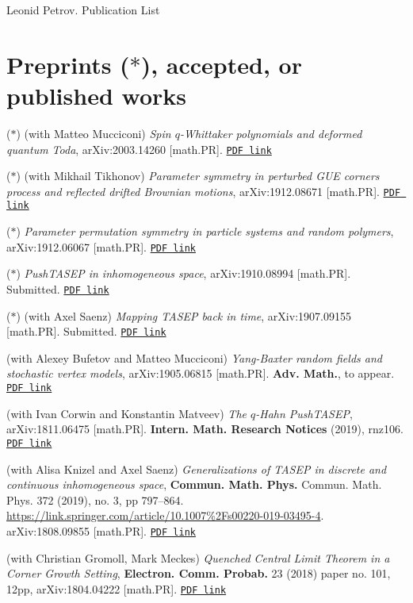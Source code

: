 \documentclass[letterpaper,11pt]{article}
\begin{document}
{\huge Leonid Petrov. Publication List}


\bigskip
\bigskip

\section*{Preprints ($*$), accepted, or published works}

\begin{etaremune}
	\renewcommand{\labelenumi}{[\theenumi]}
	\item ($*$)
		(with Matteo Mucciconi)
		\emph{Spin $q$-Whittaker polynomials and deformed quantum Toda},
		arXiv:2003.14260 [math.PR].
		\href{https://storage.lpetrov.cc/research_files/Petrov-publ/36-publ-petrov-uva.pdf}{\texttt{PDF link}}	
	\item ($*$)
		(with Mikhail Tikhonov)
		\emph{Parameter symmetry in perturbed GUE corners process and reflected drifted Brownian motions},
		arXiv:1912.08671 [math.PR].
		\href{https://storage.lpetrov.cc/research_files/Petrov-publ/35-publ-petrov-uva.pdf}{\texttt{PDF link}}	
	\item ($*$)
		\emph{Parameter permutation symmetry in particle systems and random polymers},
		arXiv:1912.06067 [math.PR].
		\href{https://storage.lpetrov.cc/research_files/Petrov-publ/34-publ-petrov-uva.pdf}{\texttt{PDF link}}	
	\item ($*$)
		\emph{PushTASEP in inhomogeneous space},
		arXiv:1910.08994 [math.PR]. Submitted.
		\href{https://storage.lpetrov.cc/research_files/Petrov-publ/33-publ-petrov-uva.pdf}{\texttt{PDF link}}	
	\item ($*$)
		(with Axel Saenz)
		\emph{Mapping TASEP back in time},
		arXiv:1907.09155 [math.PR]. Submitted.
		\href{https://storage.lpetrov.cc/research_files/Petrov-publ/32-publ-petrov-uva.pdf}{\texttt{PDF link}}	
\item 
	(with Alexey Bufetov and Matteo Mucciconi)
	\emph{Yang-Baxter random fields and stochastic vertex models},
	arXiv:1905.06815 [math.PR].
	\textbf{Adv. Math.}, to appear.
	\href{https://storage.lpetrov.cc/research_files/Petrov-publ/31-publ-petrov-uva.pdf}{\texttt{PDF link}}	
\item 
	(with Ivan Corwin and Konstantin Matveev)
	\emph{The $q$-Hahn PushTASEP},
	arXiv:1811.06475 [math.PR].
	\textbf{Intern. Math. Research Notices} (2019), rnz106.
		\href{https://storage.lpetrov.cc/research_files/Petrov-publ/30-publ-petrov-uva.pdf}{\texttt{PDF link}}	
\item 
	(with Alisa Knizel and
		Axel Saenz)
		\emph{Generalizations of TASEP in discrete and continuous inhomogeneous space},
		\textbf{Commun. Math. Phys.} 
		Commun. Math. Phys. 
		372 (2019), no. 3, pp 797–864.
		\url{https://link.springer.com/article/10.1007%2Fs00220-019-03495-4}.
		arXiv:1808.09855 [math.PR].
		\href{https://storage.lpetrov.cc/research_files/Petrov-publ/29-publ-petrov-uva.pdf}{\texttt{PDF link}}
\item (with Christian Gromoll, Mark Meckes)
		\emph{Quenched Central Limit Theorem in a Corner Growth Setting},
		\textbf{Electron. Comm. Probab.} 23 (2018) paper no. 101, 12pp,
		arXiv:1804.04222 [math.PR]. 
		\href{https://storage.lpetrov.cc/research_files/Petrov-publ/28-publ-petrov-uva.pdf}{\texttt{PDF link}}
	

\end{etaremune}
\end{document}
